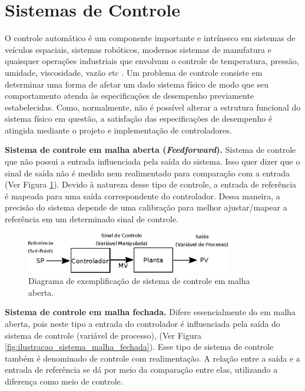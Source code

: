 \section{Sistemas de Controle}
\label{sec:sistema_controle}
O controle automático é um componente importante e intrínseco em sistemas de veículos espaciais, sistemas robóticos, modernos sistemas de manufatura e quaisquer operações industriais que envolvam o controle de temperatura, pressão, umidade, viscosidade, vazão etc \cite{ogata2011engenharia}. Um problema de controle consiste em determinar uma forma de afetar um dado sistema físico de modo que seu comportamento atenda às especificações de desempenho previamente estabelecidas. Como, normalmente, não é possível alterar a estrutura funcional do sistema físico em questão, a satisfação das especificações de desempenho é atingida mediante o projeto e implementação de controladores.


\textbf{Sistema de controle em malha aberta (\emph{Feedforward}).} Sistema de controle que não possui a entrada influenciada pela saída do sistema. Isso quer dizer que o sinal de saída não é medido nem realimentado para comparação com a entrada (Ver Figura \ref{fig:ilustracao_sistema_malha_aberta}). Devido à natureza desse tipo de controle, a entrada de referência é mapeada para uma saída correspondente do controlador. Dessa maneira, a precisão do sistema depende de uma calibração para melhor ajustar/mapear a referência em um determinado sinal de controle.

\begin{figure}[H]
    \centering
    \includegraphics[width=0.8\textwidth]{figuras/ilustracoes/diagrama_sistema_malha_aberta.eps}
    \caption{Diagrama de exemplificação de sistema de controle em malha aberta.}
    \label{fig:ilustracao_sistema_malha_aberta}
\end{figure}

\textbf{Sistema de controle em malha fechada.} Difere essencialmente do em malha aberta, pois neste tipo a entrada do controlador é influenciada pela saída do sistema de controle (variável de processo), (Ver Figura \ref{fig:ilustracao_sistema_malha_fechada}). Esse tipo de sistema de controle também é denominado de controle com realimentação. A relação entre a saída e a entrada de referência se dá por meio da comparação entre elas, utilizando a diferença como meio de controle.


